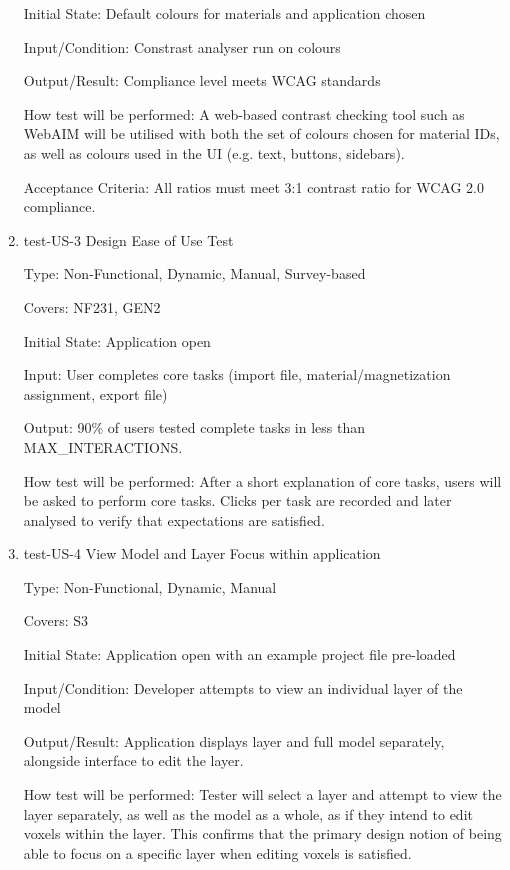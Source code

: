 \documentclass[12pt, titlepage]{article}
\begin{document}
\begin{enumerate}
Initial State: Default colours for materials and application chosen
					
Input/Condition: Constrast analyser run on colours
					
Output/Result: Compliance level meets WCAG standards
					
How test will be performed: A web-based contrast checking tool such as WebAIM will be utilised with both the set of colours chosen 
for material IDs, as well as colours used in the UI (e.g. text, buttons, sidebars).

Acceptance Criteria: All ratios must meet 3:1 contrast ratio for WCAG 2.0 compliance.

\item{test-US-3 Design Ease of Use Test\\}

Type: Non-Functional, Dynamic, Manual, Survey-based

Covers: NF231, GEN2 %
					
Initial State: Application open
					
Input: User completes core tasks (import file, material/magnetization assignment, export file)
					
Output: 90\% of users tested complete tasks in less than MAX\_INTERACTIONS.
					
How test will be performed: After a short explanation of core tasks, users will be asked to perform core tasks. Clicks per task
are recorded and later analysed to verify that expectations are satisfied.

\item{test-US-4 View Model and Layer Focus within application\\}

Type: Non-Functional, Dynamic, Manual

Covers: S3 %
					
Initial State: Application open with an example project file pre-loaded
					
Input/Condition: Developer attempts to view an individual layer of the model
					
Output/Result: Application displays layer and full model separately, alongside interface to edit the layer.
					
How test will be performed: Tester will select a layer and attempt to view the layer separately, as well as the model as a whole, 
as if they intend to edit voxels within the layer. This confirms that the primary design notion of being able to focus on a specific
layer when editing voxels is satisfied.


\end{enumerate}
\end{document}
